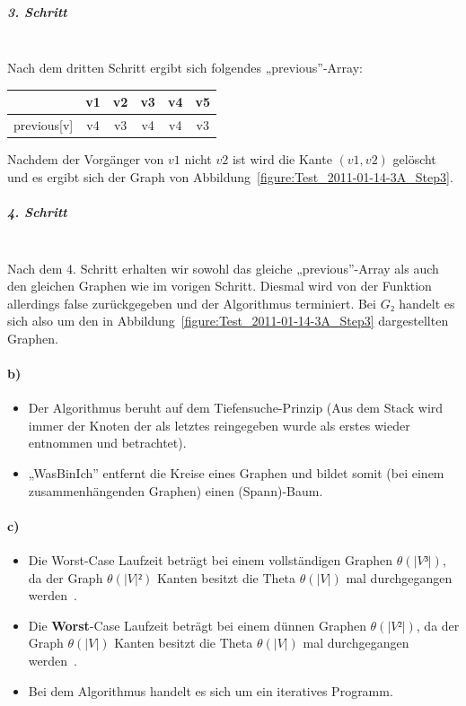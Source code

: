 \documentclass[a4paper, 12pt]{article}
\begin{document}
\subparagraph{3. Schritt}~\\

Nach dem dritten Schritt ergibt sich folgendes „previous”-Array:

\begin{center}
	\begin{tabular}{lccccc}
					& v1	& v2	& v3	& v4	& v5\\
		\hline
		previous[v] & v4	& v3	& v4	& v4	& v3\\
	\end{tabular}
\end{center}

Nachdem der Vorgänger von $v1$ nicht $v2$ ist wird die Kante $(v1,v2)$ gelöscht und es ergibt sich der Graph von Abbildung~\ref{figure:Test_2011-01-14-3A_Step3}.

\subparagraph{4. Schritt}~\\

Nach dem 4. Schritt erhalten wir sowohl das gleiche „previous”-Array als auch den gleichen Graphen wie im vorigen Schritt. Diesmal wird von der Funktion allerdings false zurückgegeben und der Algorithmus terminiert. Bei $G₂$ handelt es sich also um den in Abbildung~\ref{figure:Test_2011-01-14-3A_Step3} dargestellten Graphen.

\paragraph{b)}

\begin{itemize}
	\item Der Algorithmus beruht auf dem Tiefensuche-Prinzip (Aus dem Stack wird immer der Knoten der als letztes reingegeben wurde als erstes wieder entnommen und betrachtet).
	\item „WasBinIch” entfernt die Kreise eines Graphen und bildet somit (bei einem zusammenhängenden Graphen) einen (Spann)-Baum.
\end{itemize}

\paragraph{c)}

\begin{itemize}
	\item Die Worst-Case Laufzeit beträgt bei einem vollständigen Graphen $θ\left(|V³|\right)$, da der Graph $θ\left(|V|²\right)$ Kanten besitzt die Theta $θ\left(|V|\right)$ mal durchgegangen werden~\cite{Juggl3r_Beispiel3}.
	\item Die \textbf{Worst}-Case Laufzeit beträgt bei einem dünnen Graphen $θ\left(|V²|\right)$, da der Graph $θ\left(|V|\right)$ Kanten besitzt die Theta $θ\left(|V|\right)$ mal durchgegangen werden~\cite{Juggl3r_Beispiel3}.
	\item Bei dem Algorithmus handelt es sich um ein iteratives Programm.
\end{itemize}
\end{document}
